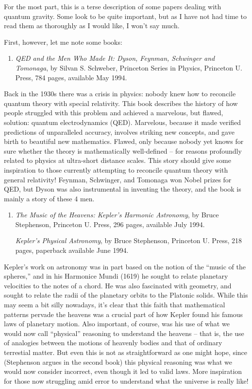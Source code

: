 \documentclass{article}
\def\tightlist{}
\begin{document}
For the most part, this is a terse description of some papers dealing
with quantum gravity. Some look to be quite important, but as I have not
had time to read them as thoroughly as I would like, I won't say much.

First, however, let me note some books:

\begin{enumerate}
\def\labelenumi{\arabic{enumi})}
\tightlist
\item
  \emph{QED and the Men Who Made It: Dyson, Feynman, Schwinger and
  Tomonaga}, by Silvan S. Schweber, Princeton Series in Physics,
  Princeton U. Press, 784 pages, available May 1994.
\end{enumerate}

Back in the 1930s there was a crisis in physics: nobody knew how to
reconcile quantum theory with special relativity. This book describes
the history of how people struggled with this problem and achieved a
marvelous, but flawed, solution: quantum electrodynamics (QED).
Marvelous, because it made verified predictions of unparalleled
accuracy, involves striking new concepts, and gave birth to beautiful
new mathematics. Flawed, only because nobody yet knows for sure whether
the theory is mathematically well-defined -- for reasons profoundly
related to physics at ultra-short distance scales. This story should
give some inspiration to those currently attempting to reconcile quantum
theory with general relativity! Feynman, Schwinger, and Tomonaga won
Nobel prizes for QED, but Dyson was also instrumental in inventing the
theory, and the book is mainly a story of these 4 men.

\begin{enumerate}
\def\labelenumi{\arabic{enumi})}
\setcounter{enumi}{1}
\item
  \emph{The Music of the Heavens: Kepler's Harmonic Astronomy}, by Bruce
  Stephenson, Princeton U. Press, 296 pages, available July 1994.

  \emph{Kepler's Physical Astronomy}, by Bruce Stephenson, Princeton U.
  Press, 218 pages, paperback available June 1994.
\end{enumerate}

Kepler's work on astronomy was in part based on the notion of the
``music of the spheres,'' and in his Harmonice Mundi (1619) he sought to
relate planetary velocities to the notes of a chord. He was also
fascinated with geometry, and sought to relate the radii of the
planetary orbits to the Platonic solids. While this may seem a bit silly
nowadays, it's clear that this faith that mathematical patterns pervade
the heavens was a crucial part of how Kepler found his famous laws of
planetary motion. Also important, of course, was his use of what we
would now call ``physical'' reasoning to understand the heavens -- that
is, the use of analogies between the motions of heavenly bodies and that
of ordinary terrestial matter. But even this is not as straightforward
as one might hope, since (Stephenson argues in the second book) this
physical reasoning was what we would now consider incorrect, even though
it led to valid laws. More inspiration for those now struggling amid
error to understand what the universe is really like!
\end{document}
